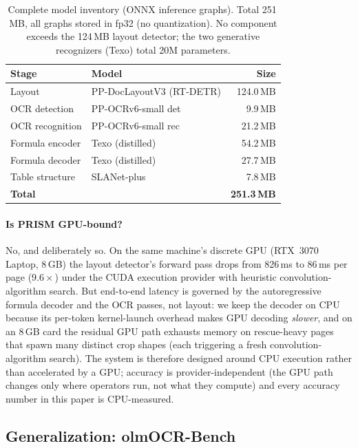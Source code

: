 \begin{table}[t]
\centering
\caption{Complete model inventory (ONNX inference graphs). Total 251\,MB, all graphs stored in fp32 (no quantization). No component exceeds the 124\,MB layout detector; the two generative recognizers (Texo) total 20M parameters.}
\label{tab:weights}
\small
\setlength{\tabcolsep}{5pt}
\begin{tabular}{llr}
\toprule
Stage & Model & Size \\
\midrule
Layout & PP-DocLayoutV3 (RT-DETR) & 124.0\,MB \\
OCR detection & PP-OCRv6-small det & 9.9\,MB \\
OCR recognition & PP-OCRv6-small rec & 21.2\,MB \\
Formula encoder & Texo (distilled) & 54.2\,MB \\
Formula decoder & Texo (distilled) & 27.7\,MB \\
Table structure & SLANet-plus & 7.8\,MB \\
\midrule
\multicolumn{2}{l}{\textbf{Total}} & \textbf{251.3\,MB} \\
\bottomrule
\end{tabular}
\end{table}

\paragraph{Is PRISM GPU-bound?} No, and deliberately so. On the same machine's discrete GPU (RTX~3070 Laptop, 8\,GB) the layout detector's forward pass drops from 826\,ms to 86\,ms per page ($9.6\times$) under the CUDA execution provider with heuristic convolution-algorithm search. But end-to-end latency is governed by the autoregressive formula decoder and the OCR passes, not layout: we keep the decoder on CPU because its per-token kernel-launch overhead makes GPU decoding \emph{slower}, and on an 8\,GB card the residual GPU path exhausts memory on rescue-heavy pages that spawn many distinct crop shapes (each triggering a fresh convolution-algorithm search). The system is therefore designed around CPU execution rather than accelerated by a GPU; accuracy is provider-independent (the GPU path changes only where operators run, not what they compute) and every accuracy number in this paper is CPU-measured.

\subsection{Generalization: olmOCR-Bench}
\label{sec:olmobench}

